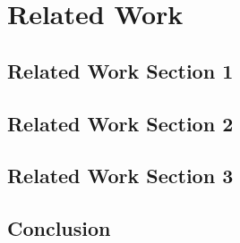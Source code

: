 %
\chapter{Related Work}
\label{sec:related}

\Blindtext[2][1]

\Blindtext[1][1]

\section{Related Work Section 1}
\label{sec:related:sec1}

\Blindtext[2][2]

\section{Related Work Section 2}
\label{sec:related:sec2}

\Blindtext[3][2]

\section{Related Work Section 3}
\label{sec:related:sec3}

\Blindtext[4][2]

\section{Conclusion}
\label{sec:related:conclusion}

\Blindtext[2][1]
